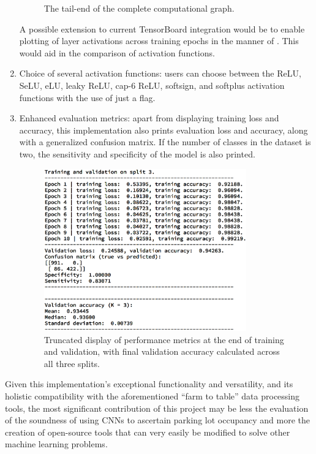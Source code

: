 \documentclass[a4paper, 11pt]{article} %
\begin{document}
\begin{enumerate}
\begin{figure}[H]
				\caption{The tail-end of the complete computational graph.}
			\end{figure}
			A possible extension to current TensorBoard integration would be to 
			enable plotting of layer activations across training epochs in the 
			manner of \cite{github-activations}. This would aid in the 
			comparison 
			of activation functions.
			\item Choice of several activation functions: users can choose 
			between the ReLU, SeLU, eLU, leaky ReLU, cap-6 
			ReLU, softsign, and softplus activation functions with the use of 
			just a 
			flag.
			\item Enhanced evaluation metrics: apart from displaying training 
			loss and accuracy, this implementation also prints evaluation 
			loss and accuracy, along with a generalized confusion matrix. If 
			the number of classes in the dataset is two, the sensitivity and 
			specificity of the model is also printed.
			\begin{figure}[H]
				\centering
				\includegraphics[height=7cm]{figures/floydhub_results_example}
				\caption{Truncated display of performance metrics at the end of 
				training and validation, with final validation accuracy 
				calculated across all three splits.}
			\end{figure}
		\end{enumerate}
		Given this implementation's exceptional functionality and versatility, 
		and its holistic compatibility with the aforementioned ``farm to 
		table'' data processing tools, the most significant contribution of 
		this project may be less the evaluation of the soundness of using CNNs 
		to ascertain parking lot occupancy and more the creation of 
		open-source tools that can very easily be modified to solve other 
		machine learning problems.
\end{document}
